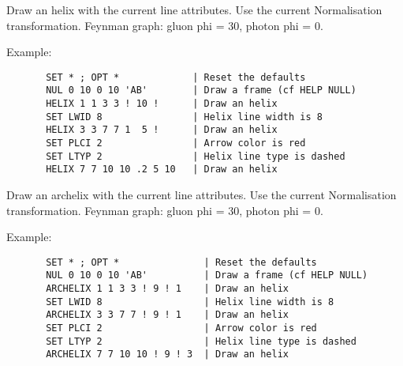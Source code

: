 \ENDCMD


\BEGARG
{}
\ENDARG

   \par
Draw an helix with the current line attributes.  Use the current 
   Normalisation transformation.  Feynman graph: gluon phi = 30, photon phi = 
   0.  

   \par
Example:  
\begin{verbatim}
       SET * ; OPT *             | Reset the defaults
       NUL 0 10 0 10 'AB'        | Draw a frame (cf HELP NULL)
       HELIX 1 1 3 3 ! 10 !      | Draw an helix
       SET LWID 8                | Helix line width is 8
       HELIX 3 3 7 7 1  5 !      | Draw an helix
       SET PLCI 2                | Arrow color is red
       SET LTYP 2                | Helix line type is dashed
       HELIX 7 7 10 10 .2 5 10   | Draw an helix
\end{verbatim}

\ENDCMD


\BEGARG
{}
\ENDARG

   \par
Draw an archelix with the current line attributes.  Use the current 
   Normalisation transformation.  Feynman graph: gluon phi = 30, photon phi = 
   0.  

   \par
Example:  
\begin{verbatim}
       SET * ; OPT *               | Reset the defaults
       NUL 0 10 0 10 'AB'          | Draw a frame (cf HELP NULL)
       ARCHELIX 1 1 3 3 ! 9 ! 1    | Draw an helix
       SET LWID 8                  | Helix line width is 8
       ARCHELIX 3 3 7 7 ! 9 ! 1    | Draw an helix
       SET PLCI 2                  | Arrow color is red
       SET LTYP 2                  | Helix line type is dashed
       ARCHELIX 7 7 10 10 ! 9 ! 3  | Draw an helix
\end{verbatim}

